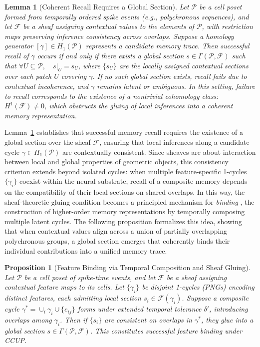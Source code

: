 \documentclass[lettersize,journal]{IEEEtran}
\newtheorem{lemma}{Lemma}
\newtheorem{proposition}{Proposition}
\begin{document}
\begin{lemma}[Coherent Recall Requires a Global Section]
Let \( \mathcal{P} \) be a cell poset formed from temporally ordered spike events (e.g., polychronous sequences), and let \( \mathcal{F} \) be a sheaf assigning contextual values to the elements of \( \mathcal{P} \), with restriction maps preserving inference consistency across overlaps.
Suppose a homology generator \( [\gamma] \in H_1(\mathcal{P}) \) represents a candidate memory trace. Then successful recall of \( \gamma \) occurs if and only if there exists a \emph{global section} \( s \in \Gamma(\mathcal{P}, \mathcal{F}) \) such that
$\forall U \subseteq \mathcal{P}, \quad s|_U = s_U$,
where \( \{s_U\} \) are the locally assigned contextual sections over each patch \( U \) covering \( \gamma \). If no such global section exists, recall fails due to contextual incoherence, and \( \gamma \) remains latent or ambiguous.
In this setting, failure to recall corresponds to the existence of a nontrivial cohomology class:
$H^1(\mathcal{F}) \ne 0$,
which obstructs the gluing of local inferences into a coherent memory representation.
\label{lemma:coherent_recall}
\end{lemma}

Lemma~\ref{lemma:coherent_recall} establishes that successful memory recall requires the existence of a global section over the sheaf \( \mathcal{F} \), ensuring that local inferences along a candidate cycle \( \gamma \in H_1(\mathcal{P}) \) are contextually consistent. Since sheaves are about interaction between local and global properties of geometric objects, this consistency criterion extends beyond isolated cycles: when multiple feature-specific 1-cycles \( \{\gamma_i\} \) coexist within the neural substrate, recall of a composite memory depends on the compatibility of their local sections on shared overlaps. In this way, the sheaf-theoretic gluing condition becomes a principled mechanism for \emph{binding} \cite{treisman1980feature}, the construction of higher-order memory representations by temporally composing multiple latent cycles. The following proposition formalizes this idea, showing that when contextual values align across a union of partially overlapping polychronous groups, a global section emerges that coherently binds their individual contributions into a unified memory trace.


\begin{proposition}[Feature Binding via Temporal Composition and Sheaf Gluing]
Let \( \mathcal{P} \) be a cell poset of spike-time events, and let \( \mathcal{F} \) be a sheaf assigning contextual feature maps to its cells.
Let \( \{\gamma_i\} \) be disjoint 1-cycles (PNGs) encoding distinct features, each admitting local section \( s_i \in \mathcal{F}(\gamma_i) \). Suppose a composite cycle \( \gamma^* = \cup_i \gamma_i \cup \{e_{ij}\} \) forms under extended temporal tolerance \( \delta' \), introducing overlaps among \( \gamma_i \).
Then if \( \{s_i\} \) are consistent on overlaps in \( \gamma^* \), they glue into a global section \( s \in \Gamma(\mathcal{P}, \mathcal{F}) \). This constitutes successful feature binding under CCUP.
\label{prop:binding}
\end{proposition}
\end{document}
